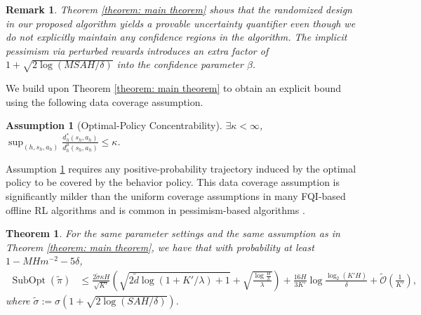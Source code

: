 \documentclass{article} \usepackage{iclr2023/iclr2023_conference,times}
\DeclareMathOperator*{\subopt}{SubOpt}
\newtheorem{assumption}{Assumption}[section]
\newtheorem{theorem}{Theorem}
\newtheorem{remark}{Remark}
\begin{document}
\begin{remark}
Theorem \ref{theorem: main theorem} shows that the randomized design in our proposed algorithm yields a provable uncertainty quantifier even though we do not explicitly maintain any confidence regions in the algorithm. {The implicit pessimism via perturbed rewards introduces an extra factor of $1 +  \sqrt{2 \log (MSAH / \delta)}$ into the confidence parameter $\beta$.} 
\label{remark: simplified params}
\end{remark}


We build upon Theorem \ref{theorem: main theorem} to obtain an explicit bound using the following data coverage assumption. 
\begin{assumption}[Optimal-Policy Concentrability]
$\exists \kappa < \infty$,  $\sup_{(h,s_h, a_h)} \frac{d^{*}_h(s_h,a_h)}{d^{\mu}_h(s_h,a_h)} \leq \kappa$. 


\label{assumption: OPC}
\end{assumption}
Assumption \ref{assumption: OPC} requires any positive-probability trajectory induced by the optimal policy to be covered by the behavior policy. This data coverage assumption is significantly milder than the uniform coverage assumptions in many FQI-based offline RL algorithms \citep{DBLP:journals/jmlr/MunosS08,chen2019information,nguyentang2021sample} and is common in pessimism-based algorithms \citep{rashidinejad2021bridging,nguyen2021offline,Chen2022OfflineRL,zhan2022offline}. 
\begin{theorem}
For the same parameter settings and the same assumption as in Theorem \ref{theorem: main theorem}, we have that 
with probability at least $1 - MH m^{-2} - 5 \delta$,
\begin{align*}
    \subopt(\tilde{\pi}) &\leq \frac{2 \tilde{\sigma} \kappa H}{\sqrt{K'}} \left( \sqrt{2\tilde{d} \log(1 + K' / \lambda) + 1} +   \sqrt{\frac{\log \frac{H}{\delta}}{\lambda}} \right) + \frac{16 H}{3 K'} \log \frac{\log_2(K' H)}{\delta} + \tilde{\mathcal{O}}(\frac{1}{K'}),
\end{align*}
where $\tilde{\sigma} := \sigma (1 +  \sqrt{2 \log (SAH / \delta)}  )$. 
\label{theorem: explicit bound}
\end{theorem}
\end{document}
